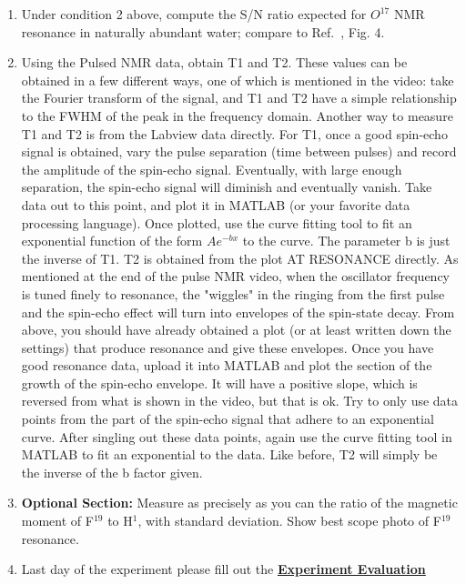 \documentclass{../lab}
\begin{document}
\begin{enumerate}
    \item Under condition 2 above, compute the S/N ratio expected for $O^{17}$ NMR resonance in naturally abundant water; compare to Ref.~\cite{Yuan}, Fig. 4.

    \item Using the Pulsed NMR data, obtain T1 and T2.  These values can be obtained in a few different ways, one of which is mentioned in the video: take the Fourier transform of the signal, and T1 and T2 have a simple relationship to the FWHM of the peak in the frequency domain. Another way to measure T1 and T2 is from the Labview data directly. For T1, once a good spin-echo signal is obtained, vary the pulse separation (time between pulses) and record the amplitude of the spin-echo signal. Eventually, with large enough separation, the spin-echo signal will diminish and eventually vanish. Take data out to this point, and plot it in MATLAB  (or your favorite data processing language). Once plotted, use the curve fitting tool to fit an exponential function of the form $Ae^{-bx}$ to the curve. The parameter b is just the inverse of T1. T2 is obtained from the plot AT RESONANCE directly. As mentioned at the end of the pulse NMR video, when the oscillator frequency is tuned finely to resonance, the "wiggles" in the ringing from the first pulse and the spin-echo effect will turn into envelopes of the spin-state decay. From above, you should have already obtained a plot (or at least written down the settings) that produce resonance and give these envelopes. Once you have good resonance data, upload it into MATLAB and plot the section of the growth of the spin-echo envelope. It will have a positive slope, which is reversed from what is shown in the video, but that is ok. Try to only use data points from the part of the spin-echo signal that adhere to an exponential curve. After singling out these data points, again use the curve fitting tool in MATLAB to fit an exponential to the data. Like before, T2 will simply be the inverse of the b factor given.

     \item \textbf{Optional Section: } Measure as precisely as you can the ratio of the magnetic moment of F$^{19}$ to H$^1$, with standard deviation. Show best scope photo of F$^{19}$ resonance.

    \item Last day of the experiment please fill out the \href{\ExperimentEvaluation}{\textbf{Experiment Evaluation}}
\end{enumerate}
\end{document}
